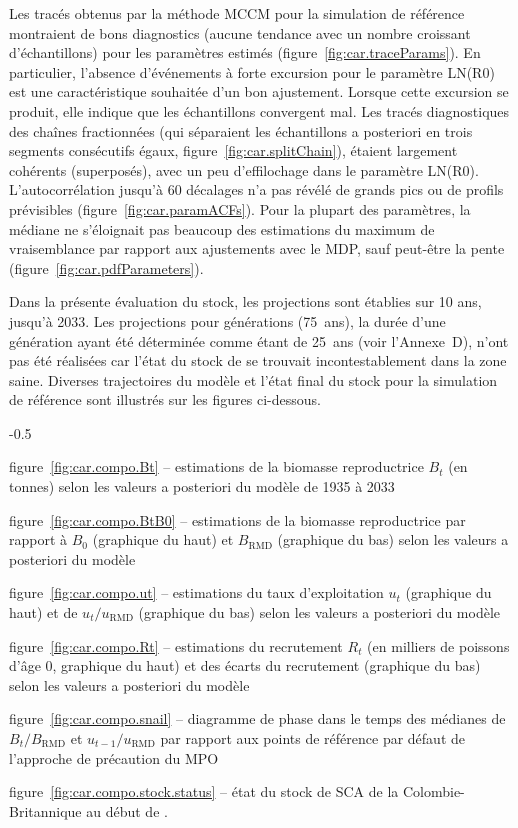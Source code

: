 \documentclass[11pt]{book}
\newcommand{\Bmsy}{B_\text{RMD}}
\newcommand{\umsy}{u_\text{RMD}}
\begin{document}
Les trac\'{e}s obtenus par la m\'{e}thode MCCM pour la simulation de r\'{e}f\'{e}rence montraient de bons diagnostics (aucune tendance avec un nombre croissant d'\'{e}chantillons) pour les param\`{e}tres estim\'{e}s (figure~\ref{fig:car.traceParams}).
En particulier, l'absence d'\'{e}v\'{e}nements \`{a} forte excursion pour le param\`{e}tre LN(R0) est une caract\'{e}ristique souhait\'{e}e d'un bon ajustement.
Lorsque cette excursion se produit, elle indique que les \'{e}chantillons convergent mal.
Les trac\'{e}s diagnostiques des cha\^{i}nes fractionn\'{e}es (qui s\'{e}paraient les \'{e}chantillons a posteriori en trois segments cons\'{e}cutifs \'{e}gaux, figure~\ref{fig:car.splitChain}), \'{e}taient largement coh\'{e}rents (superpos\'{e}s), avec un peu d'effilochage dans le param\`{e}tre LN(R0).
L'autocorr\'{e}lation jusqu'\`{a} 60 d\'{e}calages n'a pas r\'{e}v\'{e}l\'{e} de grands pics ou de profils pr\'{e}visibles (figure~\ref{fig:car.paramACFs}).
Pour la plupart des param\`{e}tres, la m\'{e}diane ne s'\'{e}loignait pas beaucoup des estimations du maximum de vraisemblance par rapport aux ajustements avec le MDP, sauf peut-\^{e}tre la pente (figure~\ref{fig:car.pdfParameters}).

Dans la pr\'{e}sente \'{e}valuation du stock, les projections sont \'{e}tablies sur 10 ans, jusqu'\`{a} 2033.  
Les projections pour  g\'{e}n\'{e}rations (75~ans), la dur\'{e}e d'une g\'{e}n\'{e}ration ayant \'{e}t\'{e} d\'{e}termin\'{e}e comme \'{e}tant de 25~ans (voir l'Annexe~D), n'ont pas \'{e}t\'{e} r\'{e}alis\'{e}es car l'\'{e}tat du stock de \SPC{} se trouvait incontestablement dans la zone saine. Diverses trajectoires du mod\`{e}le et l'\'{e}tat final du stock pour la simulation de r\'{e}f\'{e}rence sont illustr\'{e}s sur les figures ci-dessous.
\begin{itemize_csas}{-0.5}{}
  \item figure~\ref{fig:car.compo.Bt}     -- estimations de la biomasse reproductrice $B_t$ (en tonnes) selon les valeurs a posteriori du mod\`{e}le de 1935 \`{a} 2033
  \item figure~\ref{fig:car.compo.BtB0}   -- estimations de la biomasse reproductrice par rapport \`{a} $B_0$ (graphique du haut) et $\Bmsy$ (graphique du bas) selon les valeurs a posteriori du mod\`{e}le
  \item figure~\ref{fig:car.compo.ut}     -- estimations du taux d'exploitation $u_t$ (graphique du haut) et de $u_t/\umsy$ (graphique du bas) selon les valeurs a posteriori du mod\`{e}le
  \item figure~\ref{fig:car.compo.Rt}     -- estimations du recrutement $R_t$ (en milliers de poissons d'\^{a}ge 0, graphique du haut) et des \'{e}carts du recrutement (graphique du bas) selon les valeurs a posteriori du mod\`{e}le
  \item figure~\ref{fig:car.compo.snail}  -- diagramme de phase dans le temps des m\'{e}dianes de $B_t/\Bmsy$ et $u_{t-1}/\umsy$ par rapport aux points de r\'{e}f\'{e}rence par d\'{e}faut de l'approche de pr\'{e}caution du MPO
  \item figure~\ref{fig:car.compo.stock.status} -- \'{e}tat du stock de SCA de la Colombie-Britannique au d\'{e}but de \currYear{}.
\end{itemize_csas}
\end{document}
